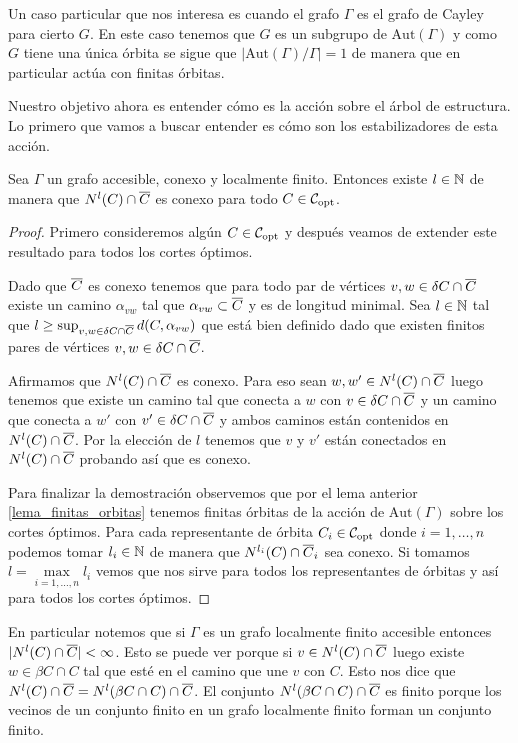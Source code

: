 \documentclass[tesis.tex]{subfiles}
\newcommand{\aut}{\text{Aut}}
\begin{document}
\begin{obs}
	Un caso particular que nos interesa es cuando el grafo $\Gamma$ es el grafo de Cayley para cierto \fg $G$.
	En este caso tenemos que $G$ es un subgrupo de $\aut(\Gamma)$ y como $G$ tiene una única órbita se sigue que $|\aut(\Gamma)/\Gamma| = 1$ de manera que en particular actúa con finitas órbitas.		
\end{obs}

Nuestro objetivo ahora es entender cómo es la acción sobre el árbol de estructura. 
Lo primero que vamos a buscar entender es cómo son los estabilizadores de esta acción.

\begin{lema}\label{lema_nlC_cap_olC_conexo}
	Sea $\Gamma$ un grafo accesible, conexo y localmente finito.
	Entonces existe $l \in \mathbb{N}$ de manera que $N^l(C) \cap \overline C$ es conexo para todo $C \in {\cal C}_{\text{opt}}$.
\end{lema}
\begin{proof}
	Primero consideremos algún $C \in {\cal C}_{\text{opt}}$ y después veamos de extender este resultado para todos los cortes óptimos.
	
	Dado que $\overline C$ es conexo tenemos que para todo par de vértices $v,w \in \delta C \cap \overline C$ existe un camino $\alpha_{vw}$ tal que $\alpha_{vw} \subset \overline C$ y es de longitud minimal.
	Sea $l \in \mathbb{N}$ tal que $l \ge \sup_{v,w \in \delta C \cap \overline C} d(C,\alpha_{vw})$ que está bien definido dado que existen finitos pares de vértices $v,w \in \delta C \cap \overline C$.
	
	Afirmamos que $N^{l}(C) \cap \overline C$ es conexo.
	Para eso sean $w,w' \in N^{l}(C) \cap \overline C$ luego tenemos que existe un camino tal que conecta a $w$ con $v  \in \delta C \cap \overline C$ y un camino que conecta a $w'$ con $v' \in \delta C \cap \overline C$ y ambos caminos están contenidos en $N^{l}(C) \cap \overline C$.
	Por la elección de $l$ tenemos que $v$ y $v'$ están conectados en $N^l(C) \cap \overline C$ probando así que es conexo.
	

	Para finalizar la demostración observemos que por el lema anterior \ref{lema_finitas_orbitas} tenemos finitas órbitas de la acción de $\aut(\Gamma)$ sobre los cortes óptimos.
	Para cada representante de órbita $C_i \in {\cal C}_{\text{opt}}$ donde $i=1,\dots,n$ podemos tomar $l_i \in \mathbb{N}$ de manera que $ N^{l_{i}}(C_{\textit{}}) \cap \overline C_{i} $ sea conexo. 
	Si tomamos $l = \underset{{i=1,\dots,n}}{\max} l_i$ vemos que nos sirve para todos los representantes de órbitas y así para todos los cortes óptimos.
	
\end{proof}
\begin{obs}
	En particular notemos que si $\Gamma$ es un grafo localmente finito accesible entonces  $|N^l(C) \cap \overline C|<\infty$. 
	Esto se puede ver porque si $v \in N^l(C) \cap \overline C$ luego existe $w \in \beta C \cap C$ tal que esté en el camino que une $v$ con $C$.
	Esto nos dice que $N^l(C) \cap \overline C = N^l(\beta C  \cap C) \cap \overline C$. 
	El conjunto $N^l(\beta C  \cap C) \cap \overline C$ es finito porque los vecinos de un conjunto finito en un grafo localmente finito forman un conjunto finito.
\end{obs}
\end{document}

